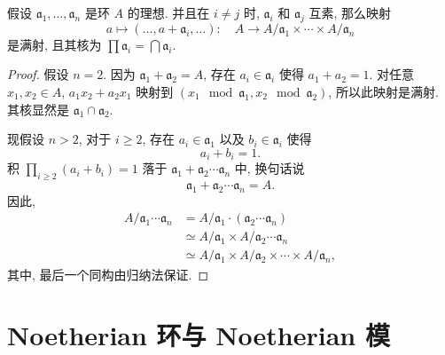 \begin{theorem}[中国剩余定理]
  假设 \( \mathfrak{a}_1, \ldots, \mathfrak{a}_n \) 是环 \( A \) 的理想. 并且在
  \( i \neq j \) 时,  \( \mathfrak{a}_i \) 和 \( \mathfrak{a}_j \) 互素,
  那么映射
  \[
    a \mapsto (\ldots, a + \mathfrak{a}_i, \ldots):\quad A \to A /
    \mathfrak{a}_1 \times \cdots \times A / \mathfrak{a}_n
  \]
  是满射, 且其核为 \( \prod \mathfrak{a}_i = \bigcap \mathfrak{a}_i \).
\end{theorem}
\begin{proof}
  假设 \( n = 2 \). 因为 \( \mathfrak{a}_1 + \mathfrak{a}_2 = A \), 存在 \( a_i
  \in \mathfrak{a}_i \) 使得 \( a_1 + a_2 = 1 \). 对任意 \( x_1, x_2 \in A \),
  \( a_1 x_2 + a_2 x_1 \) 映射到 \( (x_1 \mod{\mathfrak{a}_1}, x_2
  \mod{\mathfrak{a}_2}) \), 所以此映射是满射. 其核显然是 \( \mathfrak{a}_1 \cap
  \mathfrak{a}_2 \).

  现假设 \( n > 2 \), 对于 \( i \geq 2 \), 存在 \( a_i \in \mathfrak{a}_1 \)
  以及 \( b_i \in \mathfrak{a}_i \) 使得
  \[
    a_i + b_i = 1.
  \]
  积 \( \prod_{i \geq 2}(a_i + b_i) = 1 \) 落于 \( \mathfrak{a}_1 +
  \mathfrak{a}_2 \cdots \mathfrak{a}_n \) 中, 换句话说
  \[
    \mathfrak{a}_1 + \mathfrak{a}_2\cdots \mathfrak{a}_n = A.
  \]
  因此,
  \begin{align*}
    A / \mathfrak{a}_1 \cdots \mathfrak{a}_n &= A / \mathfrak{a}_1 \cdot
    (\mathfrak{a}_2 \cdots \mathfrak{a}_n)\\ &\simeq A / \mathfrak{a}_1 \times A
    / \mathfrak{a}_2 \cdots \mathfrak{a}_n\\ &\simeq A/ \mathfrak{a}_1 \times A
    / \mathfrak{a}_2 \times \cdots \times A / \mathfrak{a}_n,
  \end{align*}
  其中, 最后一个同构由归纳法保证.
\end{proof}

\section{Noetherian 环与 Noetherian 模}

